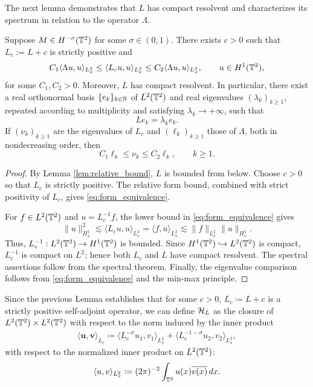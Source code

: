 The next lemma demonstrates that $L$ has compact resolvent and characterizes its spectrum in relation to the operator $\Lambda$. 
\begin{lemma}\label{lemma_equ_ev}
Suppose $M\in H^{-\sigma}(\mathbb{T}^2)$ for some $\sigma\in(0,1)$. There exists $c>0$ such that $L_c:=L+c$ is strictly positive and
\begin{equation}\label{eq:form_equivalence}
    C_1\langle\Lambda u,u\rangle_{L^2_x}
    \leq
    \langle L_cu,u\rangle_{L^2_x}
    \leq
    C_2\langle\Lambda u,u\rangle_{L^2_x},
    \qquad u\in H^1(\mathbb{T}^2),
\end{equation}
for some $C_1,C_2>0$.  Moreover, $L$ has compact resolvent.  In
particular, there exist a real orthonormal basis $\{e_k\}_{k\in \mathbb{N}}$ of
$L^2(\mathbb{T}^2)$ and real eigenvalues $(\lambda_k)_{k\geq1}$, repeated
according to multiplicity and satisfying $\lambda_k\to+\infty$, such
that
\[
    Le_k=\lambda_ke_k.
\]
If $(\nu_k)_{k\geq1}$ are the eigenvalues of $L_c$ and
$(\ell_k)_{k\geq1}$ those of $\Lambda$, both in nondecreasing order,
then
\[
    C_1\ell_k\leq\nu_k\leq C_2\ell_k,
    \qquad k\geq1.
\]
\end{lemma}

\begin{proof}
By Lemma \ref{lem:relative_bound}, $L$ is bounded from below.  Choose
$c>0$ so that $L_c$ is strictly positive.  The relative form bound,
combined with strict positivity of $L_c$, gives
\eqref{eq:form_equivalence}.

For $f\in L^2(\mathbb{T}^2)$ and $u=L_c^{-1}f$, the lower bound in
\eqref{eq:form_equivalence} gives
\[
    \|u\|_{H^1_x}^2
    \lesssim
    \langle L_cu,u\rangle_{L^2_x}
    =\langle f,u\rangle_{L^2_x}
    \lesssim
    \|f\|_{L^2_x}\|u\|_{H^1_x}.
\]
Thus, $L_c^{-1}:L^2(\mathbb{T}^2)\to H^1(\mathbb{T}^2)$ is bounded.  Since
$H^1(\mathbb{T}^2)\hookrightarrow L^2(\mathbb{T}^2)$ is compact, $L_c^{-1}$ is
compact on $L^2$; hence both $L_c$ and $L$ have compact resolvent.
The spectral assertions follow from the spectral theorem.  Finally,
the eigenvalue comparison follows from \eqref{eq:form_equivalence} and
the min-max principle.
\end{proof}
Since the previous Lemma establishes that for some $c > 0$, $L_c \coloneq L + c$ is a strictly positive self-adjoint operator, we can define $\mathcal{H}_L$ as the closure of $L^2(\mathbb{T}^2) \times L^2(\mathbb{T}^2)$ with respect to the norm induced by the inner product
\begin{align}\label{eq:inner_product}
    \langle \mathbf{u}, \mathbf{v} \rangle_{L_c} \coloneqq \langle L_c^{-\sigma} u_1, v_1 \rangle_{L^2_x} + \langle L_c^{-1-\sigma} u_2, v_2 \rangle_{L^2_x},
\end{align}
with respect to the normalized inner product on $L^2(\mathbb{T}^2)$:
\begin{align*}
    \langle u, v \rangle_{L^2_x} \coloneq (2\pi)^{-2} \int_{\mathbb{T}^2} u(x) \overline{v(x)} \, dx.
\end{align*}

